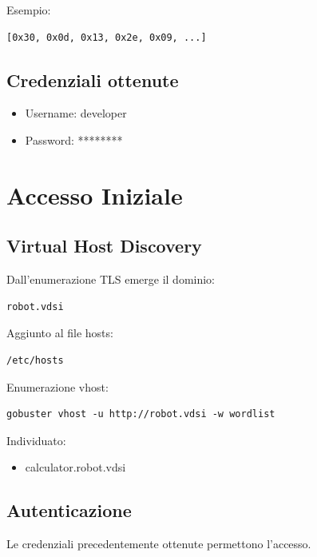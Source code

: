 \documentclass[a4paper,11pt]{article}
\begin{document}
Esempio:

\begin{lstlisting}
[0x30, 0x0d, 0x13, 0x2e, 0x09, ...]
\end{lstlisting}

\subsection{Credenziali ottenute}

\begin{itemize}
    \item Username: developer
    \item Password: ********
\end{itemize}

\section{Accesso Iniziale}

\subsection{Virtual Host Discovery}

Dall’enumerazione TLS emerge il dominio:

\begin{lstlisting}
robot.vdsi
\end{lstlisting}

Aggiunto al file hosts:

\begin{lstlisting}
/etc/hosts
\end{lstlisting}

Enumerazione vhost:

\begin{lstlisting}
gobuster vhost -u http://robot.vdsi -w wordlist
\end{lstlisting}

Individuato:

\begin{itemize}
    \item calculator.robot.vdsi
\end{itemize}

\subsection{Autenticazione}

Le credenziali precedentemente ottenute permettono l’accesso.
\end{document}
